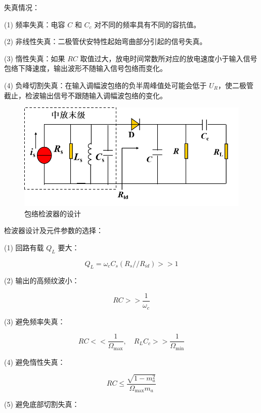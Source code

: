 失真情况：

(1) 频率失真：电容 $C$ 和 $C_c$ 对不同的频率具有不同的容抗值。

(2) 非线性失真：二极管伏安特性起始弯曲部分引起的信号失真。

(3) 惰性失真：如果 $RC$ 取值过大，放电时间常数所对应的放电速度小于输入信号包络下降速度，输出波形不随输入信号包络而变化。

(4) 负峰切割失真：在输入调幅波包络的负半周峰值处可能会低于 $U_R$，使二极管截止，检波输出信号不跟随输入调幅波包络的变化。

\begin{figure}[htbp]
    \centering
    \includegraphics[scale=0.6]{image/Picture18.png}
    \caption{包络检波器的设计}
\end{figure}

检波器设计及元件参数的选择：

(1) 回路有载 $Q_L$ 要大：

\begin{equation}
    Q_L = \omega_c C_s (R_s // R_{id}) >> 1
\end{equation}

(2) 输出的高频纹波小：

\begin{equation}
    RC >> \frac{1}{\omega_c}
\end{equation}

(3) 避免频率失真：

\begin{equation}
    RC << \frac{1}{\Omega_{\text{max}}}, \quad R_L C_c >> \frac{1}{\Omega_{\text{min}}}
\end{equation}

(4) 避免惰性失真：

\begin{equation}
    RC \leq \frac{\sqrt{1 - m_a^2}}{\Omega_{\text{max}} m_a}
\end{equation}

(5) 避免底部切割失真：

